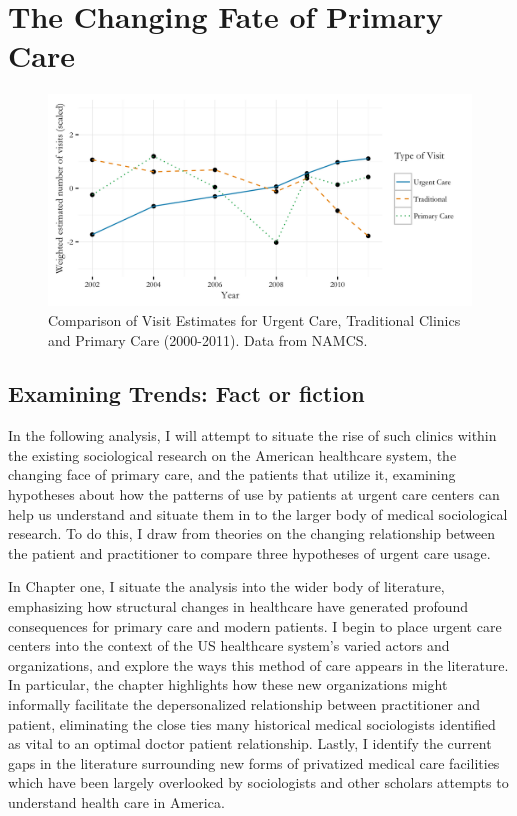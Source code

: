 \documentclass[12pt,twoside]{reedthesis}
\begin{document}
  \section*{The Changing Fate of Primary
  Care}\label{the-changing-fate-of-primary-care}
  
  \begin{figure}[h!]
  \centering
  \includegraphics[angle = 0,scale = 0.25]{figures/trends.png}
  \caption[Comparison of Health Care Trends]{\small{Comparison of Visit Estimates for Urgent Care, Traditional Clinics and Primary Care (2000-2011). Data from NAMCS.}}
  \label{fig:trends}
  \end{figure}
  
  \subsection*{Examining Trends: Fact or
  fiction}\label{examining-trends-fact-or-fiction}
  
  In the following analysis, I will attempt to situate the rise of such
  clinics within the existing sociological research on the American
  healthcare system, the changing face of primary care, and the patients
  that utilize it, examining hypotheses about how the patterns of use by
  patients at urgent care centers can help us understand and situate them
  in to the larger body of medical sociological research. To do this, I
  draw from theories on the changing relationship between the patient and
  practitioner to compare three hypotheses of urgent care usage.
  
  In Chapter one, I situate the analysis into the wider body of
  literature, emphasizing how structural changes in healthcare have
  generated profound consequences for primary care and modern patients. I
  begin to place urgent care centers into the context of the US healthcare
  system's varied actors and organizations, and explore the ways this
  method of care appears in the literature. In particular, the chapter
  highlights how these new organizations might informally facilitate the
  depersonalized relationship between practitioner and patient,
  eliminating the close ties many historical medical sociologists
  identified as vital to an optimal doctor patient relationship. Lastly, I
  identify the current gaps in the literature surrounding new forms of
  privatized medical care facilities which have been largely overlooked by
  sociologists and other scholars attempts to understand health care in
  America.
  
\end{document}
